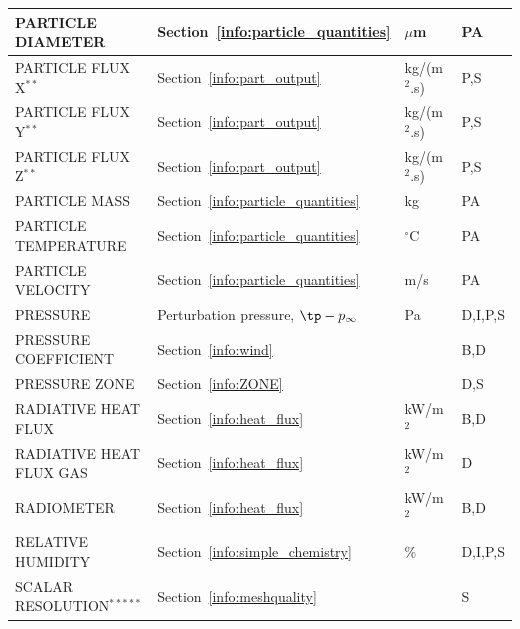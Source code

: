 \documentclass[11pt]{book}
\begin{document}
\begin{longtable}{@{\extracolsep{\fill}}|l|l|l|l|}
{\ct PARTICLE DIAMETER}                         & Section~\ref{info:particle_quantities}        & $\mu$m         & PA           \\ \hline
{\ct PARTICLE FLUX X}$^{**}$                    & Section~\ref{info:part_output}                & \si{kg/(m$^2$.s)} & P,S       \\ \hline
{\ct PARTICLE FLUX Y}$^{**}$                    & Section~\ref{info:part_output}                & \si{kg/(m$^2$.s)} & P,S       \\ \hline
{\ct PARTICLE FLUX Z}$^{**}$                    & Section~\ref{info:part_output}                & \si{kg/(m$^2$.s)} & P,S       \\ \hline
{\ct PARTICLE MASS}                             & Section~\ref{info:particle_quantities}        & kg             & PA           \\ \hline
{\ct PARTICLE TEMPERATURE}                      & Section~\ref{info:particle_quantities}        & $^\circ$C      & PA           \\ \hline
{\ct PARTICLE VELOCITY}                         & Section~\ref{info:particle_quantities}        & m/s            & PA           \\ \hline
{\ct PRESSURE}                                  & Perturbation pressure, $\tp-p_\infty$         & Pa             & D,I,P,S      \\ \hline
{\ct PRESSURE COEFFICIENT}                      & Section~\ref{info:wind}                       &                & B,D          \\ \hline
{\ct PRESSURE ZONE}                             & Section~\ref{info:ZONE}                       &                & D,S          \\ \hline
{\ct RADIATIVE HEAT FLUX}                       & Section~\ref{info:heat_flux}                  & kW/m$^2$       & B,D          \\ \hline
{\ct RADIATIVE HEAT FLUX GAS}                   & Section~\ref{info:heat_flux}                  & kW/m$^2$       & D            \\ \hline
{\ct RADIOMETER}                                & Section~\ref{info:heat_flux}                  & kW/m$^2$       & B,D          \\ \hline
{\ct RELATIVE HUMIDITY}                         & Section~\ref{info:simple_chemistry}           & \%             & D,I,P,S      \\ \hline
{\ct SCALAR RESOLUTION}$^{*****}$               & Section~\ref{info:meshquality}                &                & S            \\ \hline

\end{longtable}
\end{document}
